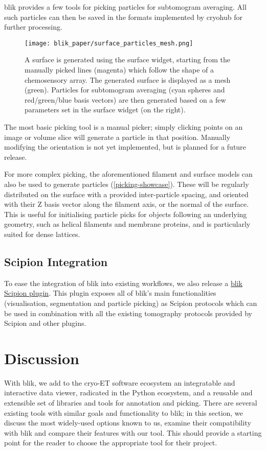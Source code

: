 blik provides a few tools for picking particles for subtomogram averaging. All such particles can then be saved in the formats implemented by cryohub for further processing.

\begin{figure}[!ht]
    \centering
    \texttt{[image: blik\_paper/surface\_particles\_mesh.png]}
    \caption[Surface mesh and particle picks]{A surface is generated using the surface widget, starting from the manually picked lines (magenta) which follow the shape of a chemosensory array. The generated surface is displayed as a mesh (green). Particles for subtomogram averaging (cyan spheres and red/green/blue basis vectors) are then generated based on a few parameters set in the surface widget (on the right).}
    \label{picking-showcase}
\end{figure}

The most basic picking tool is a manual picker; simply clicking points on an image or volume slice will generate a particle in that position. Manually modifying the orientation is not yet implemented, but is planned for a future release.

For more complex picking, the aforementioned filament and surface models can also be used to generate particles (\autoref{picking-showcase}). These will be regularly distributed on the surface with a provided inter-particle spacing, and oriented with their Z basis vector along the filament axis, or the normal of the surface. This is useful for initialising particle picks for objects following an underlying geometry, such as helical filaments and membrane proteins, and is particularly suited for dense lattices.

\subsection{Scipion Integration}\label{scipion-integration}

To ease the integration of blik into existing workflows, we also release a \href{https://github.com/scipion-em/scipion-em-blik}{blik Scipion plugin}. This plugin exposes all of blik's main functionalities (visualisation, segmentation and particle picking) as Scipion protocols which can be used in combination with all the existing tomography protocols provided by Scipion and other plugins.

\section{Discussion}
With blik, we add to the cryo-ET software ecosystem an integratable and interactive data viewer, radicated in the Python ecosystem, and a reusable and extensible set of libraries and tools for annotation and picking. There are several existing tools with similar goals and functionality to blik; in this section, we discuss the most widely-used options known to us, examine their compatibility with blik and compare their features with our tool. This should provide a starting point for the reader to choose the appropriate tool for their project.

